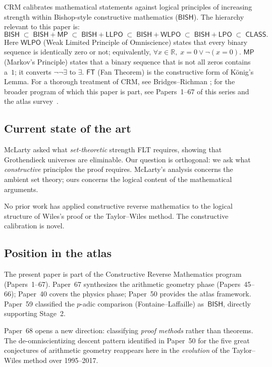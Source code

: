 \documentclass[11pt]{article}
\theoremstyle{plain}
\theoremstyle{definition}
\theoremstyle{remark}
\newcommand{\R}{\mathbb{R}}
\newcommand{\CRM}{\mathrm{CRM}}
\newcommand{\BISH}{\mathsf{BISH}}
\newcommand{\LPO}{\mathsf{LPO}}
\newcommand{\WLPO}{\mathsf{WLPO}}
\newcommand{\LLPO}{\mathsf{LLPO}}
\newcommand{\MP}{\mathsf{MP}}
\newcommand{\FT}{\mathsf{FT}}
\newcommand{\CLASS}{\mathsf{CLASS}}
\begin{document}
$\CRM$ calibrates mathematical statements against logical principles
of increasing strength within Bishop-style constructive mathematics
($\BISH$).  The hierarchy relevant to this paper is:
\[
  \BISH \;\subset\; \BISH + \MP \;\subset\; \BISH + \LLPO \;\subset\;
  \BISH + \WLPO \;\subset\; \BISH + \LPO \;\subset\; \CLASS.
\]
Here $\WLPO$ (Weak Limited Principle of Omniscience) states that
every binary sequence is identically zero or not; equivalently,
$\forall x \in \R,\; x = 0 \lor \lnot(x = 0)$.  $\MP$ (Markov's
Principle) states that a binary sequence that is not all zeros
contains a~$1$; it converts $\lnot\lnot\exists$ to $\exists$.
$\FT$ (Fan Theorem) is the constructive form of K\"onig's Lemma.
For a thorough treatment of $\CRM$, see Bridges--Richman
\cite{BridgesRichman1987}; for the broader program of which this
paper is part, see Papers~1--67 of this series and the atlas
survey~\cite{Paper50}.

\subsection{Current state of the art}

McLarty \cite{McLarty2010} asked what \emph{set-theoretic} strength
FLT requires, showing that Grothendieck universes are eliminable.
Our question is orthogonal: we ask what \emph{constructive}
principles the proof requires.  McLarty's analysis concerns the
ambient set theory; ours concerns the logical content of the
mathematical arguments.

No prior work has applied constructive reverse mathematics to the
logical structure of Wiles's proof or the Taylor--Wiles method.
The constructive calibration is novel.

\subsection{Position in the atlas}

The present paper is part of the Constructive Reverse Mathematics
program (Papers~1--67).  Paper~67 \cite{Paper67} synthesizes the
arithmetic geometry phase (Papers~45--66); Paper~40 \cite{Paper40}
covers the physics phase; Paper~50 \cite{Paper50} provides the
atlas framework.  Paper~59 \cite{Paper59} classified the $p$-adic
comparison (Fontaine--Laffaille) as~$\BISH$, directly supporting
Stage~2.

Paper~68 opens a new direction: classifying \emph{proof methods}
rather than theorems.  The de-omniscientizing descent pattern
identified in Paper~50 for the five great conjectures of arithmetic
geometry reappears here in the \emph{evolution} of the Taylor--Wiles
method over 1995--2017.
\end{document}

